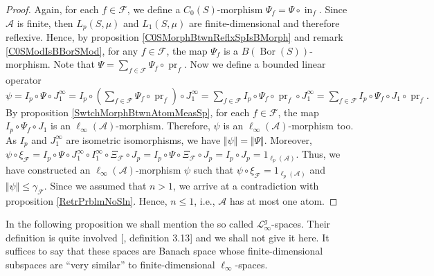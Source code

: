 \documentclass[12pt]{article}
\begin{document}
\begin{proof}
    Again, for each $f\in\mathcal{F}$, we define 
    a $C_0(S)$-morphism $\Psi_f=\Psi\circ \operatorname{in}_f$. 
    Since $\mathcal{A}$ is finite, then $L_p(S,\mu)$ and $L_1(S,\mu)$ are
    finite-dimensional and therefore reflexive. Hence, by 
    proposition \ref{C0SMorphBtwnReflxSpIsBMorph} and 
    remark \ref{C0SModIsBBorSMod}, for any $f\in\mathcal{F}$, the
    map $\Psi_f$ is a $B(\operatorname{Bor}(S))$-morphism. Note that
    $
        \Psi=\sum_{f\in\mathcal{F}} \Psi_f\circ\operatorname{pr}_f.
    $
    Now we define a bounded linear operator
    $
        \psi
        =I_p\circ\Psi\circ J_1^\infty
        =I_p\circ\left(
            \sum_{f\in\mathcal{F}} \Psi_f\circ \operatorname{pr}_f
        \right)\circ J_1^\infty 
        =\sum_{f\in\mathcal{F}} 
            I_p\circ\Psi_f\circ\operatorname{pr}_f\circ J_1^\infty 
        =\sum_{f\in\mathcal{F}} 
            I_p\circ\Psi_f\circ J_1\circ\operatorname{pr}_f.
    $
    By proposition \ref{SwtchMorphBtwnAtomMeasSp}, for each $f\in \mathcal{F}$, 
    the map $I_p\circ \Psi_f\circ J_1$ is 
    an $\ell_\infty(\mathcal{A})$-morphism. Therefore, $\psi$ is 
    an $\ell_\infty(\mathcal{A})$-morphism too. As $I_p$ and $J_1^{\infty}$ are
    isometric isomorphisms, we have $\Vert\psi\Vert=\Vert\Psi\Vert$. Moreover,
    $
        \psi\circ\xi_\mathcal{F}
        = I_p\circ\Psi\circ J_1^{\infty}\circ 
            I_1^{\infty}\circ \Xi_{\mathcal{F}}\circ J_p
        = I_p\circ\Psi\circ \Xi_{\mathcal{F}}\circ J_p
        = I_p\circ J_p
        = 1_{\ell_p(\mathcal{A})}.
    $
    Thus, we have constructed an $\ell_\infty(\mathcal{A})$-morphism $\psi$
    such that $\psi\circ\xi_{\mathcal{F}}=1_{\ell_p(\mathcal{A})}$ 
    and $\Vert \psi\Vert\leq\gamma_{\mathcal{F}}$. Since we assumed that $n>1$,
    we arrive at a contradiction with proposition \ref{RetrPrblmNoSln}. 
    Hence, $n\leq 1$, i.e., $\mathcal{A}$ has at most one atom.
\end{proof}

In the following proposition we shall mention the so 
called $\mathscr{L}_\infty^g$-spaces. Their definition is quite 
involved [\cite{DefFloTensNorOpId}, definition 3.13] and we shall not give 
it here. It suffices to say that these spaces are Banach space whose 
finite-dimensional subspaces are ``very similar'' to 
finite-dimensional $\ell_\infty$-spaces. 
\end{document}
